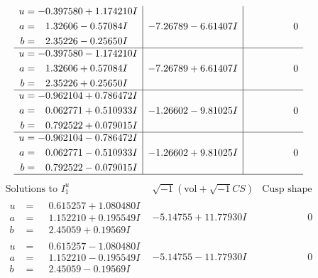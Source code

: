 \documentclass[1p]{elsarticle_modified}
\theoremstyle{definition}
\newcommand{\I}{\sqrt{-1}}
\begin{document}
$$\begin{array}{c|c|c}
\begin{aligned}
u &= -0.397580 + 1.174210 I \\
a &= \phantom{-}1.32606 - 0.57084 I \\
b &= \phantom{-}2.35226 - 0.25650 I\end{aligned}
 & -7.26789 - 6.61407 I & \phantom{-0.000000 } 0 \\ \hline\begin{aligned}
u &= -0.397580 - 1.174210 I \\
a &= \phantom{-}1.32606 + 0.57084 I \\
b &= \phantom{-}2.35226 + 0.25650 I\end{aligned}
 & -7.26789 + 6.61407 I & \phantom{-0.000000 } 0 \\ \hline\begin{aligned}
u &= -0.962104 + 0.786472 I \\
a &= \phantom{-}0.062771 + 0.510933 I \\
b &= \phantom{-}0.792522 + 0.079015 I\end{aligned}
 & -1.26602 - 9.81025 I & \phantom{-0.000000 } 0 \\ \hline\begin{aligned}
u &= -0.962104 - 0.786472 I \\
a &= \phantom{-}0.062771 - 0.510933 I \\
b &= \phantom{-}0.792522 - 0.079015 I\end{aligned}
 & -1.26602 + 9.81025 I & \phantom{-0.000000 } 0\\
 \hline 
 \end{array}$$\newpage$$\begin{array}{c|c|c}  
\text{Solutions to }I^u_{1}& \I (\text{vol} + \sqrt{-1}CS) & \text{Cusp shape}\\
 \hline 
\begin{aligned}
u &= \phantom{-}0.615257 + 1.080480 I \\
a &= \phantom{-}1.152210 + 0.195549 I \\
b &= \phantom{-}2.45059 + 0.19569 I\end{aligned}
 & -5.14755 + 11.77930 I & \phantom{-0.000000 } 0 \\ \hline\begin{aligned}
u &= \phantom{-}0.615257 - 1.080480 I \\
a &= \phantom{-}1.152210 - 0.195549 I \\
b &= \phantom{-}2.45059 - 0.19569 I\end{aligned}
 & -5.14755 - 11.77930 I & \phantom{-0.000000 } 0 \\ \hline\begin{aligned}

\end{aligned}
\end{array}$$
\end{document}
